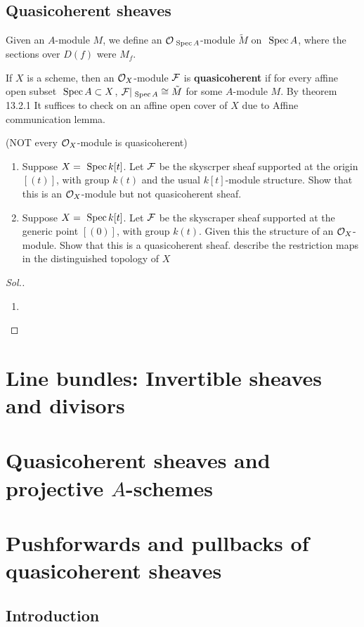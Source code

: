 \documentclass[11pt]{book} %
\begin{document}
\section{Quasicoherent sheaves}
Given an $A$-module $M$, we define an ${\cal O}_{\text{ Spec\,} A}$-module $\tilde{M}$ on $\text{ Spec\,} A$, where the sections over $D(f)$ were $M_f$.
\begin{definition}
If $X$ is a scheme, then an ${\cal O}_X$-module ${\cal F}$ is \textbf{quasicoherent} if for every affine open subset $\text{ Spec\,} A\subset X$, ${\cal F}|_{\text{ Spec\,} A}\cong\tilde{M}$ for some $A$-module $M$. By theorem 13.2.1 It suffices to check on an affine open cover of $X$ due to Affine communication lemma.
\end{definition}
\begin{exr}
(NOT every ${\cal O}_X$-module is quasicoherent)
\begin{enumerate}[label=(\alph*)]
\item Suppose $X=\text{ Spec\,} k[t]$. Let ${\cal F}$ be the skyscrper sheaf supported at the origin $[(t)]$, with group $k(t)$ and the usual $k[t]$-module structure. Show that this is an ${\cal O}_X$-module  but not quasicoherent sheaf.
\item Suppose $X=\text{ Spec\,} k[t]$. Let ${\cal F}$ be the skyscraper sheaf supported at the generic point $[(0)]$, with group $k(t)$. Given this the structure of an ${\cal O}_X$-module. Show that this is a quasicoherent sheaf. describe the restriction maps in the distinguished topology of $X$
\end{enumerate}
\end{exr}
\begin{proof}[Sol.]
\begin{enumerate}[label=(\alph*)]
\item 
\end{enumerate}
\end{proof}
\chapter{Line bundles: Invertible sheaves and divisors}
\chapter{Quasicoherent sheaves and projective $A$-schemes}
\chapter{Pushforwards and pullbacks of quasicoherent sheaves}
\section{Introduction}
\end{document}
